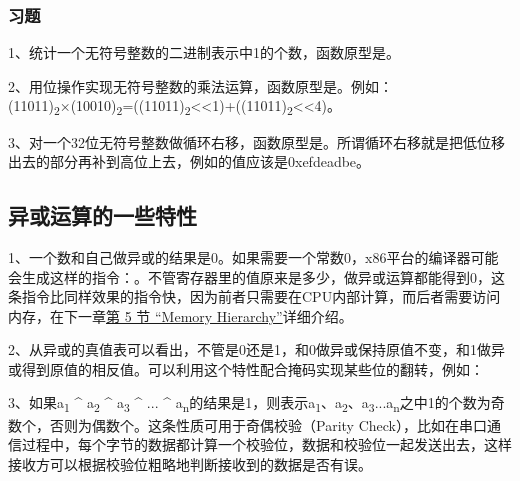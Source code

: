 \subsubsection*{习题}
%


1、统计一个无符号整数的二进制表示中1的个数，函数原型是。



2、用位操作实现无符号整数的乘法运算，函数原型是。例如：(11011)\textsubscript{2}×(10010)\textsubscript{2}=((11011)\textsubscript{2}\textless{}\textless{}1)+((11011)\textsubscript{2}\textless{}\textless{}4)。



3、对一个32位无符号整数做循环右移，函数原型是。所谓循环右移就是把低位移出去的部分再补到高位上去，例如的值应该是0xefdeadbe。


\subsection{异或运算的一些特性}
%


1、一个数和自己做异或的结果是0。如果需要一个常数0，x86平台的编译器可能会生成这样的指令：。不管寄存器里的值原来是多少，做异或运算都能得到0，这条指令比同样效果的指令快，因为前者只需要在CPU内部计算，而后者需要访问内存，在下一章\hyperlink{db.ch17s05.id2767397}{第 5 节 “Memory Hierarchy”}详细介绍。



2、从异或的真值表可以看出，不管是0还是1，和0做异或保持原值不变，和1做异或得到原值的相反值。可以利用这个特性配合掩码实现某些位的翻转，例如：




3、如果a\textsubscript{1} \textasciicircum{} a\textsubscript{2} \textasciicircum{} a\textsubscript{3} \textasciicircum{} ... \textasciicircum{} a\textsubscript{n}的结果是1，则表示a\textsubscript{1}、a\textsubscript{2}、a\textsubscript{3}...a\textsubscript{n}之中1的个数为奇数个，否则为偶数个。这条性质可用于奇偶校验（Parity Check），比如在串口通信过程中，每个字节的数据都计算一个校验位，数据和校验位一起发送出去，这样接收方可以根据校验位粗略地判断接收到的数据是否有误。



